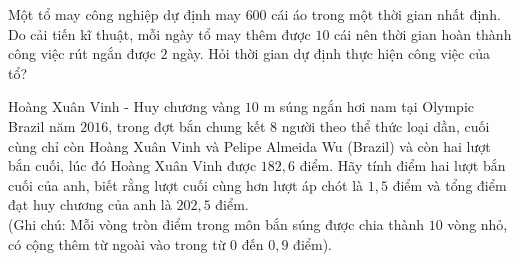 \begin{bt}%
	Một tổ may công nghiệp dự định may $600$ cái áo trong một thời gian nhất định. Do cải tiến kĩ thuật, mỗi ngày tổ may thêm được $10$ cái nên thời gian hoàn thành công việc rút ngắn được $2$ ngày. Hỏi thời gian dự định thực hiện công việc của tổ?
\end{bt}

\begin{bt}%
Hoàng Xuân Vinh - Huy chương vàng $10$ m súng ngắn hơi nam tại Olympic Brazil năm $2016$, trong đợt bắn chung kết $8$ người theo thể thức loại dần, cuối cùng chỉ còn Hoàng Xuân Vinh và Pelipe Almeida Wu (Brazil) và còn hai lượt bắn cuối, lúc đó Hoàng Xuân Vinh được $182{,}6$ điểm.
Hãy tính điểm hai lượt bắn cuối của anh, biết rằng lượt cuối cùng hơn lượt áp chót là $1{,}5$ điểm và tổng điểm đạt huy chương của anh là $202{,}5$ điểm.\\
(Ghi chú: Mỗi vòng tròn điểm trong môn bắn súng được chia thành $10$ vòng nhỏ, có cộng thêm từ ngoài vào trong từ $0$ đến $0{,}9$ điểm).
\end{bt}


